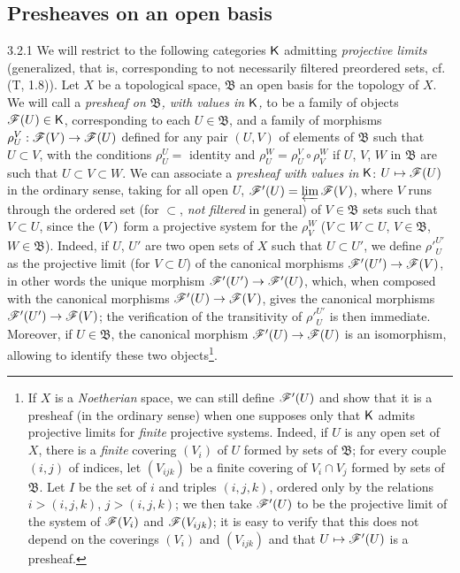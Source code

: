 \subsection{Presheaves on an open basis}
\label{0-prelim-3.2}

\begin{env}{3.2.1}
\label{env-0.3.2.1}
We will restrict to the following categories $\mathsf{K}$ admitting \emph{projective limits}
(generalized, that is, corresponding to not necessarily filtered preordered sets,
cf. (T, 1.8)). Let $X$ be a topological space, $\mathfrak{B}$ an open basis for the topology
of $X$. We will call a \emph{presheaf on $\mathfrak{B}$, with values in $\mathsf{K}$,} to be a family
of objects $\mathscr{F}(U)\in\mathsf{K}$, corresponding to each $U\in\mathfrak{B}$, and a family of
morphisms $\rho_U^V:\mathscr{F}(V)\to\mathscr{F}(U)$ defined for any pair $(U,V)$ of elements of
$\mathfrak{B}$ such that $U\subset V$,
with the conditions $\rho_U^U=$ identity and $\rho_U^W=\rho_U^V\circ\rho_V^W$ if $U$, $V$,
$W$ in $\mathfrak{B}$ are such that $U\subset V\subset W$. We can associate a \emph{presheaf
with values in} $\mathsf{K}$: $U\mapsto\mathscr{F}(U)$ in the ordinary sense, taking for all open $U$,
$\mathscr{F}'(U)=\varprojlim\mathscr{F}(V)$, where $V$ runs through the ordered set (for $\subset$,
\emph{not filtered} in general) of $V\in\mathfrak{B}$ sets such that $V\subset U$, since the
$\mathscr(V)$ form a projective system for the $\rho_V^W$ ($V\subset W\subset U$,
$V\in\mathfrak{B}$, $W\in\mathfrak{B}$). Indeed, if $U$, $U'$ are two open sets of $X$ such
that $U\subset U'$, we define ${\rho'}_U^{U'}$ as the projective limit (for $V\subset U$) of
the canonical morphisms $\mathscr{F}'(U')\to\mathscr{F}(V)$, in other words the unique morphism
$\mathscr{F}'(U')\to\mathscr{F}'(U)$, which, when composed with the canonical morphisms
$\mathscr{F}'(U)\to\mathscr{F}(V)$, gives the canonical morphisms $\mathscr{F}'(U')\to\mathscr{F}(V)$; the
verification of the transitivity of ${\rho'}_U^{U'}$ is then immediate. Moreover, if
$U\in\mathfrak{B}$, the canonical morphism $\mathscr{F}'(U)\to\mathscr{F}(U)$ is an isomorphism,
allowing to identify these two objects\footnote{If $X$ is a \emph{Noetherian} space, we can
still define $\mathscr{F}'(U)$ and show that it is a presheaf (in the ordinary sense) when one
supposes only that $\mathsf{K}$ admits projective limits for \emph{finite} projective systems.
Indeed, if $U$ is any open set of $X$, there is a \emph{finite} covering $(V_i)$ of $U$
formed by sets of $\mathfrak{B}$; for every couple $(i,j)$ of indices, let $(V_{ijk})$ be a
finite covering of $V_i\cap V_j$ formed by sets of $\mathfrak{B}$. Let $I$ be the set of $i$
and triples $(i,j,k)$, ordered only by the relations $i>(i,j,k)$, $j>(i,j,k)$; we then take
$\mathscr{F}'(U)$ to be the projective limit of the system of $\mathscr{F}(V_i)$ and $\mathscr{F}(V_{ijk})$;
it is easy to verify that this does not depend on the coverings $(V_i)$ and $(V_{ijk})$ and
that $U\mapsto\mathscr{F}'(U)$ is a presheaf.}.
\end{env}

